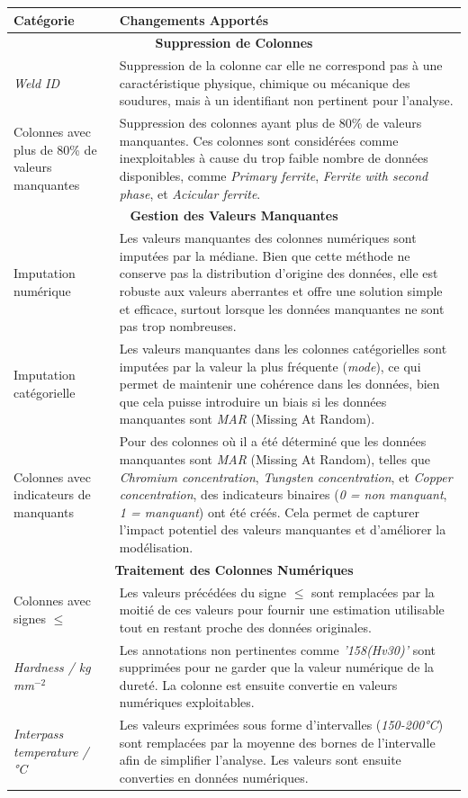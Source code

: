 \documentclass{article}
\begin{document}
\begin{longtable}{|p{4cm}|p{10cm}|}
\hline
\textbf{Catégorie} & \textbf{Changements Apportés} \\ \hline
\multicolumn{2}{|c|}{\textbf{Suppression de Colonnes}} \\ \hline
\textit{Weld ID} & Suppression de la colonne car elle ne correspond pas à une caractéristique physique, chimique ou mécanique des soudures, mais à un identifiant non pertinent pour l'analyse. \\ \hline
Colonnes avec plus de 80\% de valeurs manquantes & Suppression des colonnes ayant plus de 80\% de valeurs manquantes. Ces colonnes sont considérées comme inexploitables à cause du trop faible nombre de données disponibles, comme \textit{Primary ferrite}, \textit{Ferrite with second phase}, et \textit{Acicular ferrite}. \\ \hline

\multicolumn{2}{|c|}{\textbf{Gestion des Valeurs Manquantes}} \\ \hline
Imputation numérique & Les valeurs manquantes des colonnes numériques sont imputées par la médiane. Bien que cette méthode ne conserve pas la distribution d'origine des données, elle est robuste aux valeurs aberrantes et offre une solution simple et efficace, surtout lorsque les données manquantes ne sont pas trop nombreuses. \\ \hline
Imputation catégorielle & Les valeurs manquantes dans les colonnes catégorielles sont imputées par la valeur la plus fréquente (\textit{mode}), ce qui permet de maintenir une cohérence dans les données, bien que cela puisse introduire un biais si les données manquantes sont \textit{MAR} (Missing At Random). \\ \hline
Colonnes avec indicateurs de manquants & Pour des colonnes où il a été déterminé que les données manquantes sont \textit{MAR} (Missing At Random), telles que \textit{Chromium concentration}, \textit{Tungsten concentration}, et \textit{Copper concentration}, des indicateurs binaires (\textit{0 = non manquant}, \textit{1 = manquant}) ont été créés. Cela permet de capturer l'impact potentiel des valeurs manquantes et d'améliorer la modélisation. \\ \hline

\multicolumn{2}{|c|}{\textbf{Traitement des Colonnes Numériques}} \\ \hline
Colonnes avec signes $\leq$ & Les valeurs précédées du signe $\leq$ sont remplacées par la moitié de ces valeurs pour fournir une estimation utilisable tout en restant proche des données originales. \\ \hline
\textit{Hardness / kg mm$^{-2}$} & Les annotations non pertinentes comme \textit{'158(Hv30)'} sont supprimées pour ne garder que la valeur numérique de la dureté. La colonne est ensuite convertie en valeurs numériques exploitables. \\ \hline
\textit{Interpass temperature / °C} & Les valeurs exprimées sous forme d’intervalles (\textit{150-200°C}) sont remplacées par la moyenne des bornes de l'intervalle afin de simplifier l'analyse. Les valeurs sont ensuite converties en données numériques. \\ \hline


\end{longtable}
\end{document}
